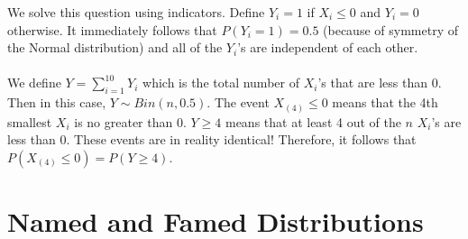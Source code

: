 \documentclass[11pt]{article}
\begin{document}
\begin{solution}
We solve this question using indicators. Define $Y_i = 1$ if $X_i \le 0$ and $Y_i = 0$ otherwise. It immediately follows that $P(Y_i=1)=0.5$ (because of symmetry of the Normal distribution) and all of the $Y_i$'s are independent of each other.\\
\\
We define $Y = \sum_{i=1}^{10} Y_i$ which is the total number of $X_i$'s that are less than 0. Then in this case, $Y \sim Bin(n, 0.5)$. The event $X_{(4)} \le 0$ means that the 4th smallest $X_i$ is no greater than 0. $Y \ge 4$ means that at least 4 out of the $n$ $X_i$'s are less than 0. These events are in reality identical! Therefore, it follows that $P(X_{(4)} \le 0) = P(Y \ge 4)$.
\end{solution}

\pagebreak

\section*{Named and Famed Distributions}
\end{document}
